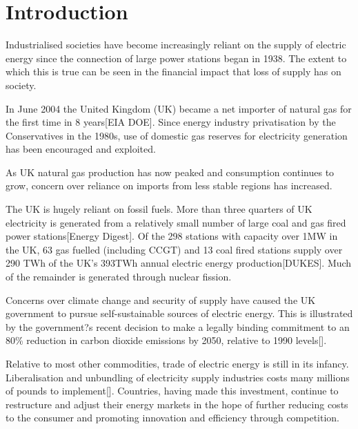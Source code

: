 \chapter{Introduction}
Industrialised societies have become increasingly reliant on the supply of
electric energy since the connection of large power stations began in 1938.
The extent to which this is true can be seen in the financial impact that loss
of supply has on society.


In June 2004 the United Kingdom (UK) became a net importer of natural gas for
the first time in 8 years[EIA DOE].  Since energy industry privatisation by
the Conservatives in the 1980s, use of domestic gas reserves for electricity
generation has been encouraged and exploited.


As UK natural gas production has now peaked and consumption continues to grow,
concern over reliance on imports from less stable regions has increased.

The UK is hugely reliant on fossil fuels.  More than three quarters of UK
electricity is generated from a relatively small number of large coal and gas
fired power stations[Energy Digest].  Of the 298 stations with capacity over
1MW in the UK, 63 gas fuelled (including CCGT) and 13 coal fired stations
supply over 290 TWh of the UK's 393TWh annual electric energy
production[DUKES].  Much of the remainder is generated through nuclear
fission.


Concerns over climate change and security of supply have caused the UK
government to pursue self-sustainable sources of electric energy.  This is
illustrated by the government?s recent decision to make a legally binding
commitment to an 80\% reduction in carbon dioxide emissions by 2050, relative
to 1990 levels[].


Relative to most other commodities, trade of electric energy is still in its
infancy.  Liberalisation and unbundling of electricity supply industries costs
many millions of pounds to implement[].  Countries, having made this
investment, continue to restructure and adjust their energy markets in the
hope of further reducing costs to the consumer and promoting innovation and
efficiency through competition.


